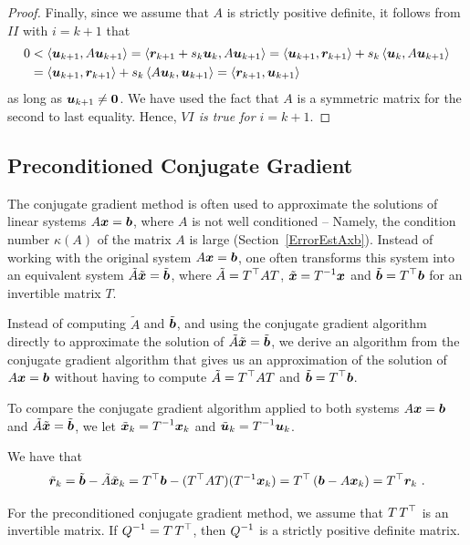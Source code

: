 \begin{proof}
Finally, since we assume that $A$ is strictly positive definite, it follows
from $II$ with $i=k+1$ that
\begin{align*}
0 &< \left\langle{\bm{u}_{k+1}} , {A\bm{u}_{k+1}}\right\rangle
= \left\langle{\bm{r}_{k+1} + s_k \bm{u}_k} , {A\bm{u}_{k+1}}\right\rangle
= \left\langle{\bm{u}_{k+1}} , {\bm{r}_{k+1}}\right\rangle + s_k \left\langle{\bm{u}_k} , {A\bm{u}_{k+1}}\right\rangle \\
&= \left\langle{\bm{u}_{k+1}} , {\bm{r}_{k+1}}\right\rangle + s_k \left\langle{A\bm{u}_k} , {\bm{u}_{k+1}}\right\rangle
= \left\langle{\bm{r}_{k+1}} , {\bm{u}_{k+1}}\right\rangle
\end{align*}
as long as $\bm{u}_{k+1} \neq \bm{0}$.  We have used the fact that $A$
is a symmetric matrix for the second to last equality.
Hence, {\em $VI$ is true for $i=k+1$}. 
\end{proof}

\subsection{Preconditioned Conjugate Gradient}

The conjugate gradient method is often used to approximate the
solutions of linear systems $A\bm{x} = \bm{b}$, where $A$ is not well
conditioned -- Namely, the condition number $\kappa(A)$ of the matrix
$A$ is large (Section~\ref{ErrorEstAxb}).  Instead of working with
the original system $A\bm{x} = \bm{b}$, one often transforms this
system into an equivalent system $\tilde{A} \tilde{\bm{x}} = \tilde{\bm{b}}$,
where $\displaystyle \tilde{A} = T^\top A T$,
$\displaystyle \tilde{\bm{x}} = T^{-1}\bm{x}$ and
$\displaystyle \tilde{\bm{b}} = T^\top \bm{b}$ for an invertible matrix $T$.

Instead of computing $\tilde{A}$ and $\tilde{\bm{b}}$, and using the
conjugate gradient algorithm directly to approximate the solution of
$\tilde{A} \tilde{\bm{x}} = \tilde{\bm{b}}$, we derive an algorithm from
the conjugate gradient algorithm that gives us an approximation of the
solution of $A\bm{x} =  \bm{b}$ without having to compute
$\displaystyle \tilde{A} =T^\top A T$ and
$\displaystyle \tilde{\bm{b}} = T^{\top}\bm{b}$.

To compare the conjugate gradient algorithm applied to both systems
$A\bm{x} = \bm{b}$ and $\tilde{A} \tilde{\bm{x}} = \tilde{\bm{b}}$, we let
$\displaystyle \tilde{\bm{x}}_k = T^{-1}\bm{x}_k$ and
$\displaystyle \tilde{\bm{u}}_k = T^{-1}\bm{u}_k$.

We have that
\[
\tildev{r}_k = \tildev{b} - \tilde{A} \tildev{x}_k
= T^\top \VEC{b} - (T^\top A T)(T^{-1} \VEC{x}_k)
= T^\top \left( \VEC{b} - A \VEC{x}_k\right) = T^\top \VEC{r}_k \ .
\]

For the preconditioned conjugate gradient method, we assume that
$\displaystyle T\,T^\top$ is an invertible matrix.  If
$\displaystyle Q^{-1} = T\,T^\top$, then
$\displaystyle Q^{-1}$ is a strictly positive definite matrix.

